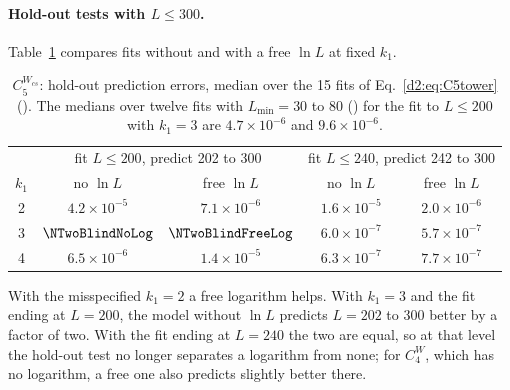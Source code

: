 \paragraph{Hold-out tests with $L\le300$.} Table~\ref{d2:tab:c5log} compares fits without and with a free $\ln L$ at fixed
$k_1$.

\begin{table}[ht]
\centering\footnotesize\renewcommand{\arraystretch}{1.15}
\begin{tabular}{@{}ccccc@{}}
\toprule
 & \multicolumn{2}{c}{fit $L\le200$, predict 202 to 300} & \multicolumn{2}{c}{fit $L\le240$, predict 242 to 300} \\
$k_1$ & no $\ln L$ & free $\ln L$ & no $\ln L$ & free $\ln L$ \\\midrule
2 & $4.2\times10^{-5}$ & $7.1\times10^{-6}$ & $1.6\times10^{-5}$ & $2.0\times10^{-6}$ \\
3 & $\NTwoBlindNoLog$ & $\NTwoBlindFreeLog$ & $6.0\times10^{-7}$ & $5.7\times10^{-7}$ \\
4 & $6.5\times10^{-6}$ & $1.4\times10^{-5}$ & $6.3\times10^{-7}$ & $7.7\times10^{-7}$ \\
\bottomrule
\end{tabular}
\caption{$C_5^{W_{cs}}$: hold-out prediction errors, median over the 15 fits of Eq.~\eqref{d2:eq:C5tower}
(). The medians over twelve fits with $L_{\min}=30$ to 80
() for the fit to $L\le200$ with $k_1=3$ are $4.7\times10^{-6}$ and $9.6\times10^{-6}$.}
\label{d2:tab:c5log}
\end{table}

With the misspecified $k_1=2$ a free logarithm helps. With $k_1=3$ and the fit ending at $L=200$, the model without $\ln L$
predicts $L=202$ to 300 better by a factor of two. With the fit ending at $L=240$ the two are equal, so at that level the
hold-out test no longer separates a logarithm from none; for $C_4^W$, which has no logarithm, a free one also predicts slightly
better there.

